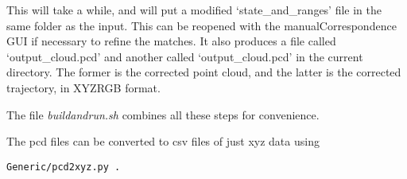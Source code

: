 \documentclass[12pt]{amsart}
\begin{document}
This will take a while, and will put a modified `state\_and\_ranges' file in the same folder as the input. This can be reopened with the manualCorrespondence GUI if necessary to refine the matches. It also produces a file called `output\_cloud.pcd' and another called `output\_cloud.pcd' in the current directory. The former is the corrected point cloud, and the latter is the corrected trajectory, in XYZRGB format.


The file \emph{buildandrun.sh} combines all these steps for convenience.

The pcd files can be converted to csv files of just xyz data using 
\begin{lstlisting}
Generic/pcd2xyz.py .
\end{lstlisting}
\end{document}
